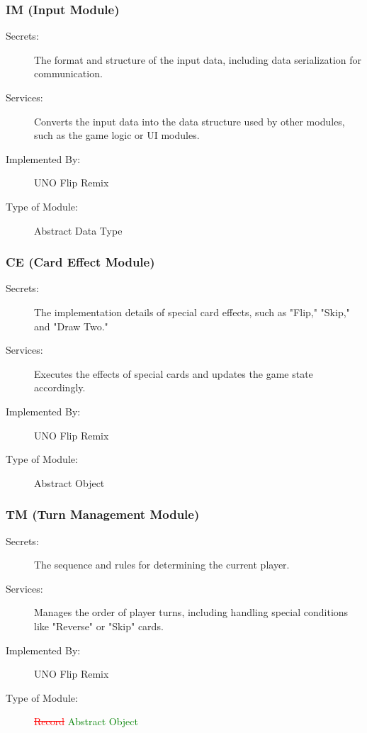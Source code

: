 \documentclass[12pt, titlepage]{article}
\newcommand{\removed}[1]{\textcolor{red}{\sout{#1}}}
\newcommand{\added}[1]{\textcolor{green}{#1}}
\begin{document}
\subsubsection{IM (Input Module)} \label{mIM}

\begin{description}
\item[Secrets:] The format and structure of the input data, including data serialization for communication.
\item[Services:] Converts the input data into the data structure used by other modules, such as the game logic or UI modules.
\item[Implemented By:] UNO Flip Remix
\item[Type of Module:] Abstract Data Type
\end{description}

\subsubsection{CE (Card Effect Module)} \label{mCE}

\begin{description}
\item[Secrets:] The implementation details of special card effects, such as "Flip," "Skip," and "Draw Two."
\item[Services:] Executes the effects of special cards and updates the game state accordingly.
\item[Implemented By:] UNO Flip Remix
\item[Type of Module:] Abstract Object
\end{description}

\subsubsection{TM (Turn Management Module)} \label{mTM}

\begin{description}
\item[Secrets:] The sequence and rules for determining the current player.
\item[Services:] Manages the order of player turns, including handling special conditions like "Reverse" or "Skip" cards.
\item[Implemented By:] UNO Flip Remix
\item[Type of Module:] \removed{Record} \added{Abstract Object}
\end{description}
\end{document}
